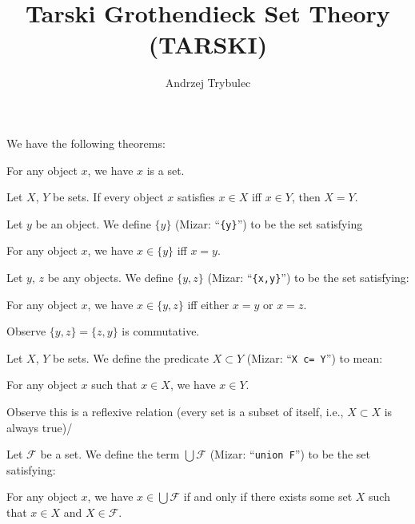 \documentclass{article}
\title{Tarski Grothendieck Set Theory (TARSKI)}
\author{Andrzej Trybulec}
\begin{document}
\maketitle

We have the following theorems:

\begin{thm}
\item For any object $x$, we have $x$ is a set.
\item Let $X$, $Y$ be sets. If every object $x$ satisfies $x\in X$ iff
  $x\in Y$, then $X=Y$. 
\end{thm}

\begin{definition}
Let $y$ be an object. We define $\{y\}$ (Mizar: ``\verb#{y}#'') to be the set satisfying
\begin{defn}
\item For any object $x$, we have $x\in\{y\}$ iff $x=y$.
\end{defn}
Let $y$, $z$ be any objects. We define $\{y,z\}$ (Mizar: ``\verb#{x,y}#'') to be the set satisfying:
\begin{defn}
\item For any object $x$, we have $x\in\{y,z\}$ iff either $x=y$ or $x=z$.
\end{defn}
Observe $\{y,z\}=\{z,y\}$ is commutative.
\end{definition}

\begin{definition}
Let $X$, $Y$ be sets. We define the predicate $X\subset Y$ (Mizar:
``\verb#X c= Y#'') to mean:
\begin{defn}
\item For any object $x$ such that $x\in X$, we have $x\in Y$.
\end{defn}
Observe this is a reflexive relation (every set is a subset of itself,
i.e., $X\subset X$ is always true)/
\end{definition}

\begin{definition}
Let $\mathcal{F}$ be a set. We define the term $\bigcup\mathcal{F}$
(Mizar: ``\verb#union F#'') to
be the set satisfying:
\begin{defn}
\item For any object $x$, we have $x\in\bigcup\mathcal{F}$ if and only
  if there exists some set $X$ such that $x\in X$ and $X\in\mathcal{F}$.
\end{defn}
\end{definition}
\end{document}
